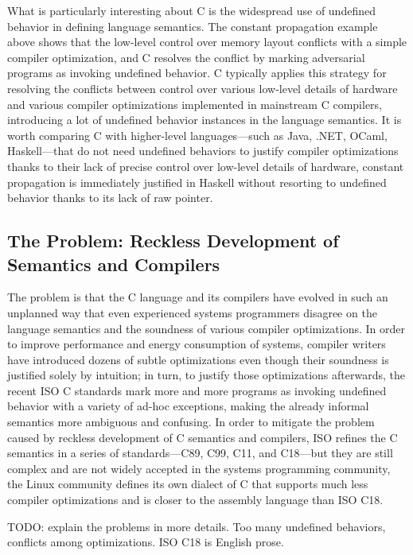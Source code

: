 What is particularly interesting about C is the widespread use of undefined behavior in defining
language semantics.  The constant propagation example above shows that the low-level control over
memory layout conflicts with a simple compiler optimization, and C resolves the conflict by marking
adversarial programs as invoking undefined behavior.  C typically applies this strategy for
resolving the conflicts between control over various low-level details of hardware and various
compiler optimizations implemented in mainstream C compilers, introducing a lot of undefined
behavior instances in the language semantics.  It is worth comparing C with higher-level
languages---such as Java, .NET, OCaml, Haskell---that do not need undefined behaviors to justify
compiler optimizations thanks to their lack of precise control over low-level details of hardware,
\eg{} constant propagation is immediately justified in Haskell without resorting to undefined
behavior thanks to its lack of raw pointer.


\subsection{The Problem: Reckless Development of Semantics and Compilers}

The problem is that the C language and its compilers have evolved in such an unplanned way that even
experienced systems programmers disagree on the language semantics and the soundness of various
compiler optimizations.  In order to improve performance and energy consumption of systems, compiler
writers have introduced dozens of subtle optimizations even though their soundness is justified
solely by intuition; in turn, to justify those optimizations afterwards, the recent ISO C standards
mark more and more programs as invoking undefined behavior with a variety of ad-hoc exceptions,
making the already informal semantics more ambiguous and confusing.  In order to mitigate the
problem caused by reckless development of C semantics and compilers, ISO refines the C semantics in
a series of standards---C89, C99, C11, and C18---but they are still complex and are not widely
accepted in the systems programming community, \eg{} the Linux community defines its own dialect of
C that supports much less compiler optimizations and is closer to the assembly language than ISO
C18.

TODO: explain the problems in more details.  Too many undefined behaviors, conflicts among
optimizations.  ISO C18 is English prose.


